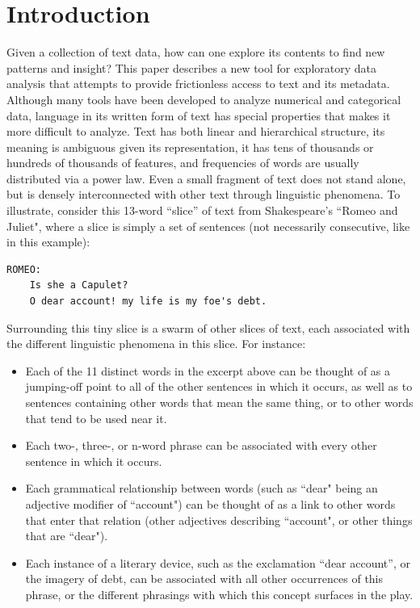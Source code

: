 \documentclass{sig-alternate}
\begin{document}
\section{Introduction}
Given a collection of text data, how can one explore its contents to find new patterns and insight?  This paper describes a new tool for exploratory data analysis \cite{tukey1977exploratory} that attempts to provide frictionless access to text and its metadata.  Although many tools have been developed to analyze numerical and categorical data, language in its written form of text has special properties that makes it more difficult to analyze. Text has both linear and hierarchical structure, its meaning is ambiguous given its representation, it has tens of thousands or hundreds of thousands of features, and frequencies of words are usually distributed via a power law.   Even a small fragment of text does not stand alone, but is densely interconnected with other text through linguistic phenomena.  To illustrate, consider this 13-word ``slice'' of text from Shakespeare's ``Romeo and Juliet", where a slice is simply a set of sentences (not necessarily consecutive, like in this example):

\begin{verbatim}
ROMEO:
    Is she a Capulet?
    O dear account! my life is my foe's debt.
\end{verbatim}

Surrounding this tiny slice is a swarm of other slices of text, each associated with the different linguistic phenomena in this slice. For instance:
\begin{itemize}
\item Each of the 11 distinct words in the excerpt above can be thought of as a jumping-off point to all of the other sentences in which it occurs, as well as to sentences containing other words that mean the same thing, or to other words that tend to be used near it.
\item Each  two-, three-, or n-word phrase can be associated with every other sentence in which it occurs.
\item  Each grammatical relationship between words (such as ``dear" being an adjective modifier of  ``account") can be thought of as a link to other words that enter that relation (other adjectives describing ``account", or other things that are ``dear").
\item Each instance of a literary device, such as the exclamation ``dear account'', or the imagery of debt, can be associated with all other occurrences of this phrase, or the different phrasings with which this concept surfaces in the play.
\end{itemize}
\end{document}
